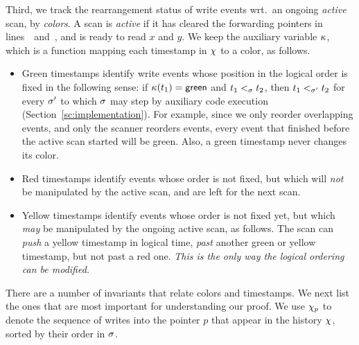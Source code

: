 Third, we track the rearrangement status of write events wrt.~an
ongoing \emph{active} scan, by \emph{colors}. A scan is \emph{active}
if it has cleared the forwarding pointers in
lines~\lineScanClearsX\ and\ \lineScanClearsY, and is ready to read
$x$ and $y$. We keep the auxiliary variable $\kappa$, which is a function
mapping each timestamp in $\chi$ to a color, as follows.
%
%
\begin{itemize}
\item {\sf Green} timestamps identify write events whose position in
  the logical order is fixed in the following sense: if $\kappa(t_1) =
  \mathsf{green}$ and $t_1 \mathrel{<_\sigma} t_2$, then $t_1 <_{\sigma'} t_2$ for
  every $\sigma'$ to which $\sigma$ may step by auxiliary code
  execution (Section~\ref{sc:implementation}). For example, since we
  only reorder overlapping events, and only the scanner reorders
  events, every event that finished before the active scan started
  will be green. Also, a green timestamp never changes its color.

\item {\sf Red} timestamps identify events whose order is not fixed,
  but which will \emph{not} be manipulated by the active scan, and are
  left for the next scan.

\item {\sf Yellow} timestamps identify events whose order is not fixed
  yet, but which \emph{may} be manipulated by the ongoing active scan,
  as follows.  The scan can \emph{push} a yellow timestamp in logical
  time, \emph{past} another green or yellow timestamp, but not past a
  red one. \emph{This is the only way the logical ordering can be
    modified.}

%
\end{itemize}
%

There are a number of invariants that relate colors and timestamps. We
next list the ones that are most important for understanding our
proof. We use $\chi_p$ to denote the sequence of writes into the
pointer $p$ that appear in the history $\chi$, sorted by their order
in $\sigma$\footnotemark.


